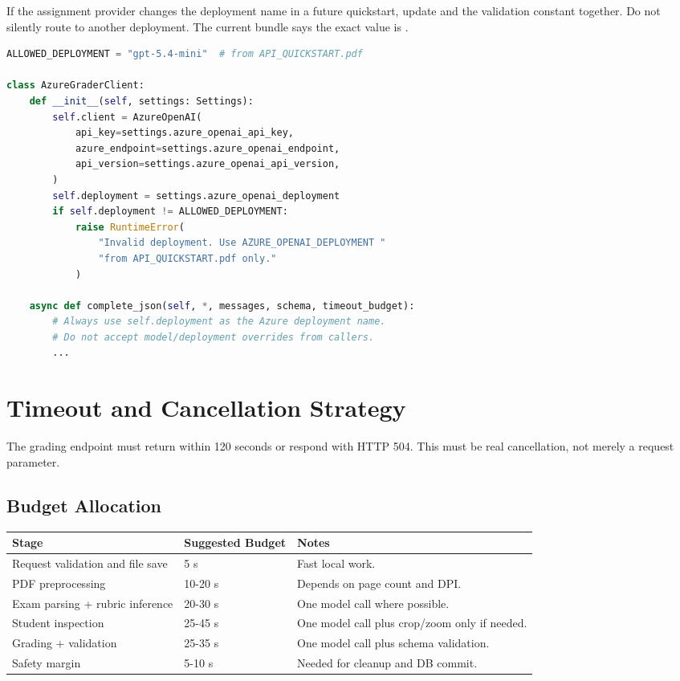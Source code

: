 \documentclass[11pt,a4paper]{article}
\newcommand{\code}[1]{\texttt{\detokenize{#1}}}
\begin{document}
\begin{notebox}
If the assignment provider changes the deployment name in a future quickstart, update \code{.env.example} and the validation constant together. Do not silently route to another deployment. The current bundle says the exact value is \code{gpt-5.4-mini}.
\end{notebox}

\begin{lstlisting}[language=Python]
ALLOWED_DEPLOYMENT = "gpt-5.4-mini"  # from API_QUICKSTART.pdf

class AzureGraderClient:
    def __init__(self, settings: Settings):
        self.client = AzureOpenAI(
            api_key=settings.azure_openai_api_key,
            azure_endpoint=settings.azure_openai_endpoint,
            api_version=settings.azure_openai_api_version,
        )
        self.deployment = settings.azure_openai_deployment
        if self.deployment != ALLOWED_DEPLOYMENT:
            raise RuntimeError(
                "Invalid deployment. Use AZURE_OPENAI_DEPLOYMENT "
                "from API_QUICKSTART.pdf only."
            )

    async def complete_json(self, *, messages, schema, timeout_budget):
        # Always use self.deployment as the Azure deployment name.
        # Do not accept model/deployment overrides from callers.
        ...
\end{lstlisting}

\section{Timeout and Cancellation Strategy}

The grading endpoint must return within 120 seconds or respond with HTTP 504. This must be real cancellation, not merely a request parameter.

\subsection{Budget Allocation}

\begin{longtable}{p{}p{}p{}}
\toprule
\textbf{Stage} & \textbf{Suggested Budget} & \textbf{Notes} \\
\midrule
Request validation and file save & 5 s & Fast local work. \\
PDF preprocessing & 10-20 s & Depends on page count and DPI. \\
Exam parsing + rubric inference & 20-30 s & One model call where possible. \\
Student inspection & 25-45 s & One model call plus crop/zoom only if needed. \\
Grading + validation & 25-35 s & One model call plus schema validation. \\
Safety margin & 5-10 s & Needed for cleanup and DB commit. \\
\bottomrule
\end{longtable}
\end{document}
